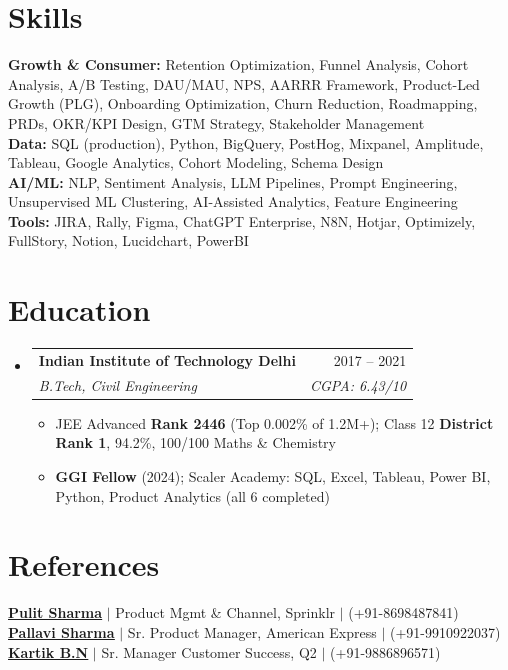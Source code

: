 \documentclass[a4paper,10pt]{article}
\makeatletter
\newcommand{\resumeItem}[1]{
  \item\small{#1\vspace{-2pt}}
}
\newcommand{\resumeSubheading}[4]{
  \vspace{-2pt}\item
  \begin{tabular*}{0.97\textwidth}[t]{l@{\extracolsep{\fill}}r}
    \textbf{#1} & #2 \\
    \textit{\small#3} & \textit{\small #4} \\
  \end{tabular*}\vspace{-7pt}
}
\newcommand{\resumeSubHeadingListStart}{\begin{itemize}[leftmargin=0.15in, label={}]}
\newcommand{\resumeSubHeadingListEnd}{\end{itemize}}
\newcommand{\resumeItemListStart}{\begin{itemize}\parfillskip=0pt}
\newcommand{\resumeItemListEnd}{\end{itemize}\vspace{-5pt}}
\makeatother
\begin{document}
\section{Skills}
\begin{itemize}[leftmargin=0.15in, label={}]
  \small{\item{
    \textbf{Growth \& Consumer:}{ Retention Optimization, Funnel Analysis, Cohort Analysis, A/B Testing, DAU/MAU, NPS, AARRR Framework, Product-Led Growth (PLG), Onboarding Optimization, Churn Reduction, Roadmapping, PRDs, OKR/KPI Design, GTM Strategy, Stakeholder Management} \\
    \textbf{Data:}{ SQL (production), Python, BigQuery, PostHog, Mixpanel, Amplitude, Tableau, Google Analytics, Cohort Modeling, Schema Design} \\
    \textbf{AI/ML:}{ NLP, Sentiment Analysis, LLM Pipelines, Prompt Engineering, Unsupervised ML Clustering, AI-Assisted Analytics, Feature Engineering} \\
    \textbf{Tools:}{ JIRA, Rally, Figma, ChatGPT Enterprise, N8N, Hotjar, Optimizely, FullStory, Notion, Lucidchart, PowerBI}
  }}
\end{itemize}

\section{Education}
\resumeSubHeadingListStart
  \resumeSubheading
    {Indian Institute of Technology Delhi}{2017 -- 2021}
    {B.Tech, Civil Engineering}{CGPA: 6.43/10}
  \resumeItemListStart
    \resumeItem{JEE Advanced \textbf{Rank 2446} (Top 0.002\% of 1.2M+); Class 12 \textbf{District Rank 1}, 94.2\%, 100/100 Maths \& Chemistry}
    \resumeItem{\textbf{GGI Fellow} (2024); Scaler Academy: SQL, Excel, Tableau, Power BI, Python, Product Analytics (all 6 completed)}
  \resumeItemListEnd
\resumeSubHeadingListEnd

\vspace{-6pt}
\section{References}
\begin{itemize}[leftmargin=0.15in, label={}]
  \small{\item{
    \href{https://linkedin.com/in/pulit-sharma-36426349}{\textbf{\underline{Pulit Sharma}}} $|$ Product Mgmt \& Channel, Sprinklr $|$ (+91-8698487841) \\
    \href{https://linkedin.com/in/pallavi-sharma-54088159}{\textbf{\underline{Pallavi Sharma}}} $|$ Sr. Product Manager, American Express $|$ (+91-9910922037) \\
    \href{https://linkedin.com/in/kartik-bn-3770807b}{\textbf{\underline{Kartik B.N}}} $|$ Sr. Manager Customer Success, Q2 $|$ (+91-9886896571)
  }}
\end{itemize}
\end{document}
